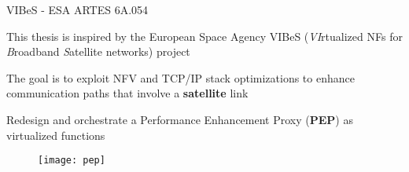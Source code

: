 \begin{frame}{VIBeS - ESA ARTES  6A.054}

  This thesis is inspired by the European Space Agency VIBeS (\emph{VI}rtualized
  NFs for \emph{B}roadband \emph{S}atellite networks) project

  \vfill{}

  The goal is to exploit NFV and TCP/IP stack optimizations to enhance
  communication paths that involve a \textbf{satellite} link

  \vfill{}

  Redesign and orchestrate a Performance Enhancement Proxy (\textbf{PEP}) as
  virtualized functions

  \vfill{}

  \begin{figure}
    \centering
    \texttt{[image: pep]}
  \end{figure}

\end{frame}